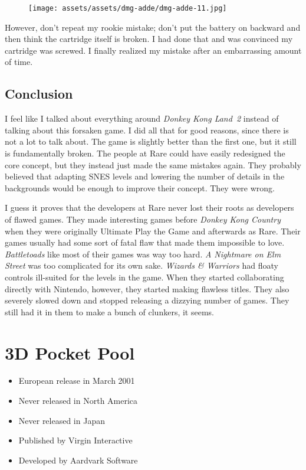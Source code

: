 \documentclass{book}
\begin{document}
\begin{figure}[hbt]
\vskip 10pt
\centering \texttt{[image: assets/assets/dmg-adde/dmg-adde-11.jpg]}
\vskip 6pt
\end{figure}
However, don’t repeat my rookie mistake; don’t put the battery on backward and then think the cartridge itself is broken. I had done that and was convinced my cartridge was screwed. I finally realized my mistake after an embarrassing amount of time.

\FloatBarrier\needspace{5pt}\section*{Conclusion}\nopagebreak[4]

I feel like I talked about everything around \emph{Donkey Kong Land 2} instead of talking about this forsaken game. I did all that for good reasons, since there is not a lot to talk about. The game is slightly better than the first one, but it still is fundamentally broken. The people at Rare could have easily redesigned the core concept, but they instead just made the same mistakes again. They probably believed that adapting SNES levels and lowering the number of details in the backgrounds would be enough to improve their concept. They were wrong.

I guess it proves that the developers at Rare never lost their roots as developers of flawed games. They made interesting games before \emph{Donkey Kong Country} when they were originally Ultimate Play the Game and afterwards as Rare. Their games usually had some sort of fatal flaw that made them impossible to love. \emph{Battletoads} like most of their games was way too hard. \emph{A Nightmare on Elm Street} was too complicated for its own sake. \emph{Wizards \& Warriors} had floaty controls ill-suited for the levels in the game. When they started collaborating directly with Nintendo, however, they started making flawless titles. They also severely slowed down and stopped releasing a dizzying number of games. They still had it in them to make a bunch of clunkers, it seems.


\begingroup \chapter*{3D Pocket Pool} \endgroup

\begin{itemize} \setlength\itemsep{-0.4em}
\item European release in March 2001
\item Never released in North America
\item Never released in Japan
\item Published by Virgin Interactive
\item Developed by Aardvark Software
\end{itemize}\noindent
\end{document}
